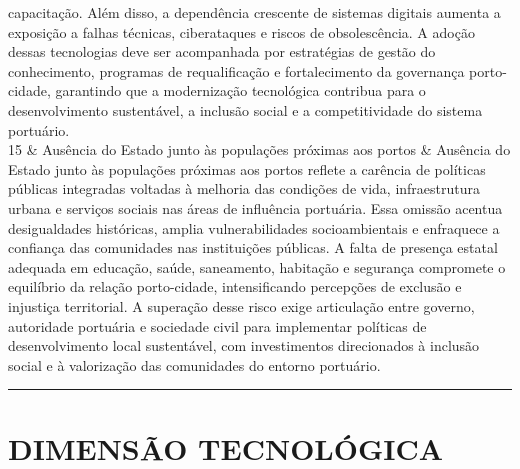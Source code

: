 \documentclass[
  portuguese,
  letterpaper,
  DIV=11,
  numbers=noendperiod]{scrreprt}
\begin{document}
\begin{longtable}[]
capacitação. Além disso, a dependência crescente de sistemas digitais
aumenta a exposição a falhas técnicas, ciberataques e riscos de
obsolescência. A adoção dessas tecnologias deve ser acompanhada por
estratégias de gestão do conhecimento, programas de requalificação e
fortalecimento da governança porto-cidade, garantindo que a modernização
tecnológica contribua para o desenvolvimento sustentável, a inclusão
social e a competitividade do sistema portuário. \\
15 & Ausência do Estado junto às populações próximas aos portos &
Ausência do Estado junto às populações próximas aos portos reflete a
carência de políticas públicas integradas voltadas à melhoria das
condições de vida, infraestrutura urbana e serviços sociais nas áreas de
influência portuária. Essa omissão acentua desigualdades históricas,
amplia vulnerabilidades socioambientais e enfraquece a confiança das
comunidades nas instituições públicas. A falta de presença estatal
adequada em educação, saúde, saneamento, habitação e segurança
compromete o equilíbrio da relação porto-cidade, intensificando
percepções de exclusão e injustiça territorial. A superação desse risco
exige articulação entre governo, autoridade portuária e sociedade civil
para implementar políticas de desenvolvimento local sustentável, com
investimentos direcionados à inclusão social e à valorização das
comunidades do entorno portuário. \\
\end{longtable}

\begin{center}\rule{0.5\linewidth}{0.5pt}\end{center}

\section{DIMENSÃO TECNOLÓGICA}\label{dimensuxe3o-tecnoluxf3gica}
\end{document}
